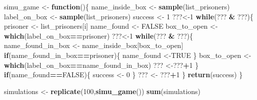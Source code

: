\documentclass[]{book}
\newenvironment{Shaded}{\begin{snugshade}}{\end{snugshade}}
\newcommand{\ControlFlowTok}[1]{\textcolor[rgb]{0.13,0.29,0.53}{\textbf{#1}}}
\newcommand{\DecValTok}[1]{\textcolor[rgb]{0.00,0.00,0.81}{#1}}
\newcommand{\KeywordTok}[1]{\textcolor[rgb]{0.13,0.29,0.53}{\textbf{#1}}}
\newcommand{\NormalTok}[1]{#1}
\newcommand{\OperatorTok}[1]{\textcolor[rgb]{0.81,0.36,0.00}{\textbf{#1}}}
\newcommand{\OtherTok}[1]{\textcolor[rgb]{0.56,0.35,0.01}{#1}}
\newcommand{\StringTok}[1]{\textcolor[rgb]{0.31,0.60,0.02}{#1}}
\begin{document}
\begin{Shaded}
\begin{Highlighting}[]
\NormalTok{simu_game <-}\StringTok{ }\ControlFlowTok{function}\NormalTok{()\{}
\NormalTok{  name_inside_box <-}\StringTok{ }\KeywordTok{sample}\NormalTok{(list_prisoners)}
\NormalTok{  label_on_box <-}\StringTok{ }\KeywordTok{sample}\NormalTok{(list_prisoners)}
\NormalTok{  success <-}\StringTok{ }\DecValTok{1}
\NormalTok{  ???<-}\DecValTok{1}
  \ControlFlowTok{while}\NormalTok{(??? }\OperatorTok{&}\StringTok{ }\NormalTok{???)\{}
\NormalTok{    prisoner <-}\StringTok{ }\NormalTok{list_prisoners[i]}
\NormalTok{    name_found <-}\StringTok{ }\OtherTok{FALSE}
\NormalTok{    box_to_open <-}\StringTok{ }\KeywordTok{which}\NormalTok{(label_on_box}\OperatorTok{==}\NormalTok{prisoner)}
\NormalTok{    ???<-}\DecValTok{1}
    \ControlFlowTok{while}\NormalTok{(??? }\OperatorTok{&}\StringTok{ }\NormalTok{???)\{}
\NormalTok{      name_found_in_box <-}\StringTok{ }\NormalTok{name_inside_box[box_to_open]}
      \ControlFlowTok{if}\NormalTok{(name_found_in_box}\OperatorTok{==}\NormalTok{prisoner)\{}
\NormalTok{        name_found <-}\OtherTok{TRUE}
\NormalTok{      \}}
\NormalTok{      box_to_open <-}\StringTok{ }\KeywordTok{which}\NormalTok{(label_on_box}\OperatorTok{==}\NormalTok{name_found_in_box)}
\NormalTok{      ??? <-???}\OperatorTok{+}\DecValTok{1}
\NormalTok{    \}}
    \ControlFlowTok{if}\NormalTok{(name_found}\OperatorTok{==}\OtherTok{FALSE}\NormalTok{)\{}
\NormalTok{      success <-}\StringTok{ }\DecValTok{0}
\NormalTok{    \}}
\NormalTok{    ??? <-}\StringTok{ }\NormalTok{???}\OperatorTok{+}\DecValTok{1}
\NormalTok{  \}}
  \KeywordTok{return}\NormalTok{(success)}
\NormalTok{\}}

\NormalTok{simulations <-}\StringTok{ }\KeywordTok{replicate}\NormalTok{(}\DecValTok{100}\NormalTok{,}\KeywordTok{simu_game}\NormalTok{())}
\KeywordTok{sum}\NormalTok{(simulations)}
\end{Highlighting}
\end{Shaded}


\end{document}
